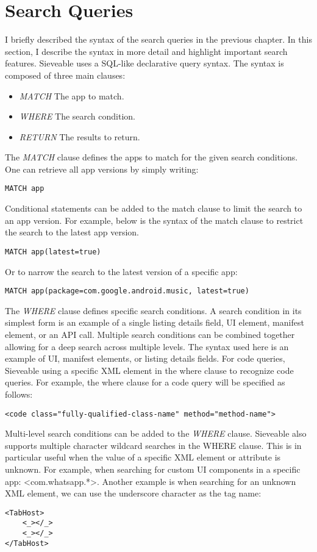 \section{Search Queries}
I briefly described the syntax of the search queries in the previous chapter.
In this section, I describe the syntax in more detail and highlight important search features.
Sieveable uses a SQL-like declarative query syntax.
The syntax is composed of three main clauses:
\begin{itemize}
	\item \textit{MATCH} The app to match.
	\item \textit{WHERE} The search condition.
	\item \textit{RETURN} The results to return.
\end{itemize}
The \textit{MATCH} clause defines the apps to match for the given search conditions.
One can retrieve all app versions by simply writing:
\begin{verbatim}
MATCH app
\end{verbatim}
Conditional statements can be added to the match clause to limit the search to an app version.
For example, below is the syntax of the match clause to restrict the search to the latest app version.
\begin{verbatim}
MATCH app(latest=true)
\end{verbatim}
Or to narrow the search to the latest version of a specific app:
\begin{verbatim}
MATCH app(package=com.google.android.music, latest=true)
\end{verbatim}

The \textit{WHERE} clause defines specific search conditions. 
A search condition in its simplest form is an example of a single listing details field, UI element, manifest element, or an API call.
Multiple search conditions can be combined together allowing for a deep search across multiple levels.
The syntax used here is an example of UI, manifest elements, or listing details fields.
For code queries, Sieveable using a specific XML element in the where clause to recognize code queries.
For example, the where clause for a code query will be specified as follows:
\begin{verbatim}
<code class="fully-qualified-class-name" method="method-name">
\end{verbatim}
Multi-level search conditions can be added to the \textit{WHERE} clause.
Sieveable also supports multiple character wildcard searches in the WHERE clause.
This is in particular useful when the value of a specific XML element or attribute is unknown.
For example, when searching for custom UI components in a specific app: \textless com.whatsapp.*\textgreater.
Another example is when searching for an unknown XML element, we can use the underscore character as the tag name:
\begin{verbatim}
<TabHost>
    <_></_>
    <_></_>
</TabHost>
\end{verbatim}

